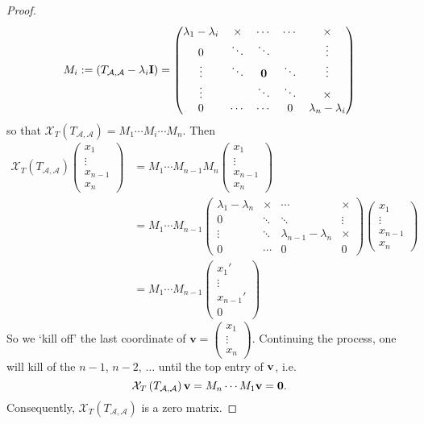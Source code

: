 \begin{proof}
$$M_i := \left( T_{\mathcal{A},\mathcal{A}} - \lambda_i \mathbf{I} \right) = \begin{pmatrix}
\lambda_1 - \lambda_i & \times & \cdots & \cdots &\times \\
0 & \ddots & \ddots & & \vdots \\
\vdots & \ddots & {\bf 0} & \ddots& \vdots \\
\vdots &  & \ddots &\ddots  &\times \\
0 & \cdots & \cdots & 0 &\lambda_n - \lambda_i
\end{pmatrix}$$
so that ${\mathcal{X}}_{T}\left( T_{\mathcal{A},\mathcal{A}}\right) = M_1\cdots M_i \cdots M_n$. Then
\begin{align*}
{\mathcal{X}}_{T}\left( T_{\mathcal{A},\mathcal{A}}\right)
\begin{pmatrix}
x_1 \\
\vdots \\
x_{n-1} \\
x_n
\end{pmatrix}
&=
M_1\cdots M_{n-1} M_n \begin{pmatrix}
x_1 \\
\vdots \\
x_{n-1} \\
x_n
\end{pmatrix} \\
&= M_1\cdots M_{n-1}\begin{pmatrix}
\lambda_1 - \lambda_n & \times &  \cdots &\times \\
0 & \ddots & \ddots & \vdots \\
\vdots &  \ddots &\lambda_{n-1} - \lambda_n  &\times \\
0  & \cdots & 0 & 0
\end{pmatrix}\begin{pmatrix}
x_1 \\
\vdots \\
x_{n-1} \\
x_n
\end{pmatrix} \\
&= M_1\cdots M_{n-1}\begin{pmatrix}
x_1' \\
\vdots \\
x_{n-1}' \\
0
\end{pmatrix}
\end{align*}
So we `kill off' the last coordinate of $\mathbf{v} =  \begin{pmatrix}
x_1 \\
\vdots \\
x_n 
\end{pmatrix}$. Continuing the process, one will kill of the $n-1$, $n-2$, $\dots$ until the top entry of ${\bf v}$, i.e.
\[
{\mathcal{X}}_{T}\left( T_{\mathcal{A},\mathcal{A}}\right){\bf v} = M_n \cdots M_1 \mathbf{v} = {\bf 0}.
\]
Consequently, ${\mathcal{X}}_{T}\left( T_{\mathcal{A},\mathcal{A}} \right)$ is a zero matrix.
\end{proof}

